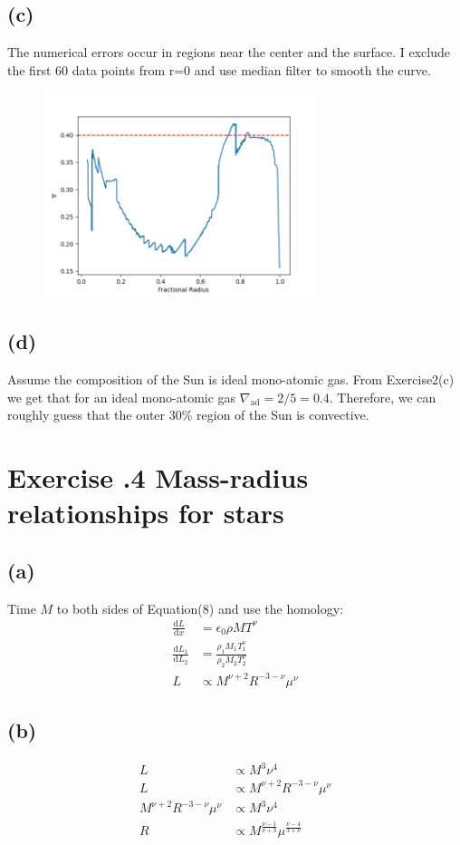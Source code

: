 \documentclass[a4paper,12pt]{article}
\renewcommand{\d}{\mathrm{d}}
\begin{document}
\subsection*{(c)}
The numerical errors occur in regions near the center and the surface. I exclude the first 60 data points 
from r=0 and use median filter to smooth the curve.
\begin{figure}[htbp]
    \centering
    \includegraphics*[width=8cm]{nabla.png}
\end{figure}

\subsection*{(d)}
Assume the composition of the Sun is ideal mono-atomic gas. 
From Exercise2(c) we get that for an ideal mono-atomic gas $\nabla_{\text{ad}} = 2/5=0.4$.
Therefore, we can roughly guess that the outer 30\% region of the Sun is convective.


\section*{\textbf{Exercise \uppercase\expandafter{}.4 Mass-radius relationships for stars}}
\subsection*{(a)}
Time $M$ to both sides of Equation(8) and use the homology:
\begin{align*}
    \frac{\d L}{\d x} &= \epsilon_0 \rho M T^\nu \\
    \frac{\d L_1}{\d L_2} &= \frac{\rho_1 M_1 T_1^\nu}{\rho_2 M_2 T_2^\nu} \\
    L & \propto M^{\nu+2} R^{-3-\nu} \mu^{\nu}
\end{align*}

\subsection*{(b)}
\begin{align*}
    L &\propto M^3 \nu^4 \\
    L & \propto M^{\nu+2} R^{-3-\nu} \mu^{\nu} \\
    M^{\nu+2} R^{-3-\nu} \mu^{\nu} &\propto M^3 \nu^4 \\
    R &\propto M^{\frac{\nu -1}{\nu +3}} \mu^{\frac{\nu -4}{3+\nu }}
\end{align*}
\end{document}
